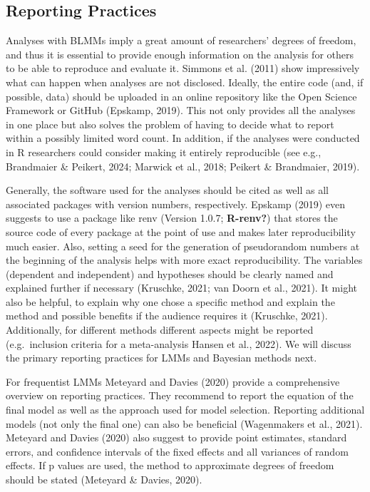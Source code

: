 \documentclass[
  doc,12pt,floatsintext]{apa7}
\begin{document}
\subsection{Reporting Practices}\label{reporting-practices}

Analyses with BLMMs imply a great amount of researchers' degrees of freedom, and thus it is essential to provide enough information on the analysis for others to be able to reproduce and evaluate it. Simmons et al. (2011) show impressively what can happen when analyses are not disclosed. Ideally, the entire code (and, if possible, data) should be uploaded in an online repository like the Open Science Framework or GitHub (Epskamp, 2019). This not only provides all the analyses in one place but also solves the problem of having to decide what to report within a possibly limited word count. In addition, if the analyses were conducted in R researchers could consider making it entirely reproducible (see e.g., Brandmaier \& Peikert, 2024; Marwick et al., 2018; Peikert \& Brandmaier, 2019).

Generally, the software used for the analyses should be cited as well as all associated packages with version numbers, respectively. Epskamp (2019) even suggests to use a package like renv (Version 1.0.7; \textbf{R-renv?}) that stores the source code of every package at the point of use and makes later reproducibility much easier. Also, setting a seed for the generation of pseudorandom numbers at the beginning of the analysis helps with more exact reproducibility. The variables (dependent and independent) and hypotheses should be clearly named and explained further if necessary (Kruschke, 2021; van Doorn et al., 2021). It might also be helpful, to explain why one chose a specific method and explain the method and possible benefits if the audience requires it (Kruschke, 2021). Additionally, for different methods different aspects might be reported (e.g.~inclusion criteria for a meta-analysis Hansen et al., 2022). We will discuss the primary reporting practices for LMMs and Bayesian methods next.

For frequentist LMMs Meteyard and Davies (2020) provide a comprehensive overview on reporting practices. They recommend to report the equation of the final model as well as the approach used for model selection. Reporting additional models (not only the final one) can also be beneficial (Wagenmakers et al., 2021). Meteyard and Davies (2020) also suggest to provide point estimates, standard errors, and confidence intervals of the fixed effects and all variances of random effects. If p values are used, the method to approximate degrees of freedom should be stated (Meteyard \& Davies, 2020).
\end{document}
